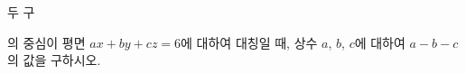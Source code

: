 두 구 \par\smallskip{}\par{}\par\smallskip\noindent 의 중심이 평면 $ax+by+cz=6$에 대하여 대칭일 때, 상수 $a$, $b$, $c$에 대하여 $a-b-c$의 값을 구하시오.
